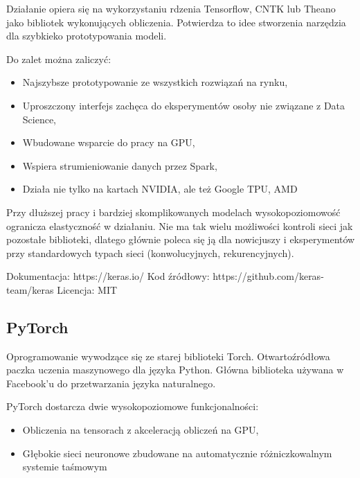 \documentclass[12pt,a4paper,twoside,titlepage,openright]{book}
\begin{document}
Działanie opiera się na wykorzystaniu rdzenia Tensorflow, CNTK lub Theano jako bibliotek wykonujących obliczenia. Potwierdza to idee stworzenia narzędzia dla szybkieko prototypowania modeli.

Do zalet można zaliczyć:
\begin{itemize}
\item Najszybsze prototypowanie ze wszystkich rozwiązań na rynku,
\item Uproszczony interfejs zachęca do eksperymentów osoby nie związane z Data Science,
\item Wbudowane wsparcie do pracy na GPU,
\item Wspiera strumieniowanie danych przez Spark,
\item Działa nie tylko na kartach NVIDIA, ale też Google TPU, AMD
\end{itemize}

Przy dłuższej pracy i bardziej skomplikowanych modelach wysokopoziomowość ogranicza elastyczność w działaniu. Nie ma tak wielu możliwości kontroli sieci jak pozostałe biblioteki, dlatego głównie poleca się ją dla nowicjuszy i eksperymentów przy standardowych typach sieci (konwolucyjnych, rekurencyjnych).

\noindent
\newline 
Dokumentacja: https://keras.io/
\newline 
Kod źródłowy: https://github.com/keras-team/keras
\newline 
Licencja: MIT

\subsection{PyTorch}
Oprogramowanie wywodzące się ze starej biblioteki Torch. Otwartoźródłowa paczka uczenia maszynowego dla języka Python. Główna biblioteka używana w Facebook'u do przetwarzania języka naturalnego. 

PyTorch dostarcza dwie wysokopoziomowe funkcjonalności:
\begin{itemize}
\item Obliczenia na tensorach z akceleracją obliczeń na GPU,
\item Głębokie sieci neuronowe zbudowane na automatycznie różniczkowalnym systemie taśmowym
\end{itemize}
\end{document}
